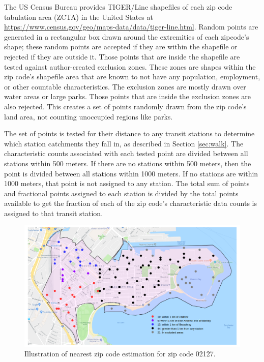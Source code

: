 \documentclass[11pt]{article}
\begin{document}
The US Census Bureau provides TIGER/Line shapefiles of each zip code tabulation area (ZCTA) in the United States at \url{https://www.census.gov/geo/maps-data/data/tiger-line.html}. Random points are generated in a rectangular box drawn around the extremities of each zipcode's shape; these random points are accepted if they are within the shapefile or rejected if they are outside it. Those points that are inside the shapefile are tested against author-created exclusion zones. These zones are shapes within the zip code's shapefile area that are known to not have any population, employment, or other countable characteristics. The exclusion zones are mostly drawn over water areas or large parks. Those points that are inside the exclusion zones are also rejected. This creates a set of points randomly drawn from the zip code's land area, not counting unoccupied regions like parks. 

The set of points is tested for their distance to any transit stations to determine which station catchments they fall in, as described in Section \ref{sec:walk}. The characteristic counts associated with each tested point are divided between all stations within 500 meters. If there are no stations within 500 meters, then the point is divided between all stations within 1000 meters. If no stations are within 1000 meters, that point is not assigned to any station. The total sum of points and fractional points assigned to each station is divided by the total points available to get the fraction of each of the zip code's characteristic data counts is assigned to that transit station. 

\begin{figure}
\begin{center}\includegraphics[scale=0.55]{geo_point_demonstration}\end{center}\caption{Illustration of nearest zip code estimation for zip code 02127.}\label{fig:f1}
\end{figure}
\end{document}
